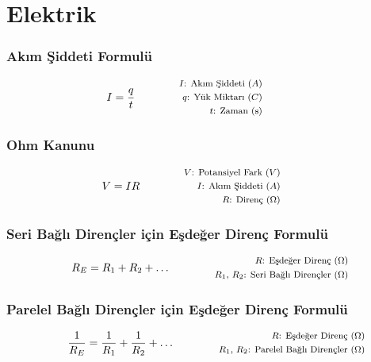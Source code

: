\section{Elektrik}

\subsubsection*{Akım Şiddeti Formulü}
\begin{equation}
    I = \frac{q}{t} \qquad \qquad \parbox{4cm}{\footnotesize$\begin{aligned}
        I\text{: Akım Şiddeti } (A) \\
        q\text{: Yük Miktarı } (C) \\
        t\text{: Zaman (s)}
\end{aligned}$}
\end{equation}

\subsubsection*{Ohm Kanunu}
\begin{equation}
    V = IR \qquad \qquad \parbox{4cm}{\footnotesize$\begin{aligned}
        V\text{: Potansiyel Fark } (V) \\
        I\text{: Akım Şiddeti } (A) \\
        R\text{: Direnç } (\Omega)
\end{aligned}$}
\end{equation}

\subsubsection*{Seri Bağlı Dirençler için Eşdeğer Direnç Formulü}
\begin{equation}
    R_E = R_1 + R_2 + \dots \qquad \qquad \parbox{4cm}{\footnotesize$\begin{aligned}
        R\text{: Eşdeğer Direnç } (\Omega) \\
        R_1\text{, }R_2\text{: Seri Bağlı Dirençler } (\Omega)
\end{aligned}$}
\end{equation}

\subsubsection*{Parelel Bağlı Dirençler için Eşdeğer Direnç Formulü}
\begin{equation}
    \frac{1}{R_E} = \frac{1}{R_1} + \frac{1}{R_2} + \dots \qquad \qquad \parbox{4cm}{\footnotesize$\begin{aligned}
        R\text{: Eşdeğer Direnç } (\Omega) \\
        R_1\text{, }R_2\text{: Parelel Bağlı Dirençler } (\Omega)
\end{aligned}$}
\end{equation}

